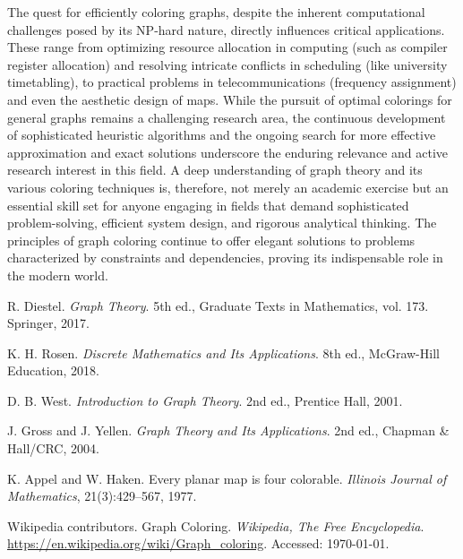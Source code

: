 \documentclass[11pt, a4paper]{article}
\begin{document}
The quest for efficiently coloring graphs, despite the inherent computational challenges posed by its NP-hard nature, directly influences critical applications. These range from optimizing resource allocation in computing (such as compiler register allocation) and resolving intricate conflicts in scheduling (like university timetabling), to practical problems in telecommunications (frequency assignment) and even the aesthetic design of maps. While the pursuit of optimal colorings for general graphs remains a challenging research area, the continuous development of sophisticated heuristic algorithms and the ongoing search for more effective approximation and exact solutions underscore the enduring relevance and active research interest in this field. A deep understanding of graph theory and its various coloring techniques is, therefore, not merely an academic exercise but an essential skill set for anyone engaging in fields that demand sophisticated problem-solving, efficient system design, and rigorous analytical thinking. The principles of graph coloring continue to offer elegant solutions to problems characterized by constraints and dependencies, proving its indispensable role in the modern world.

\newpage
\begin{thebibliography}{99} %
    R. Diestel. \textit{Graph Theory}. 5th ed., Graduate Texts in Mathematics, vol. 173. Springer, 2017.

    K. H. Rosen. \textit{Discrete Mathematics and Its Applications}. 8th ed., McGraw-Hill Education, 2018.

    D. B. West. \textit{Introduction to Graph Theory}. 2nd ed., Prentice Hall, 2001.

    J. Gross and J. Yellen. \textit{Graph Theory and Its Applications}. 2nd ed., Chapman & Hall/CRC, 2004.

    K. Appel and W. Haken. Every planar map is four colorable. \textit{Illinois Journal of Mathematics}, 21(3):429--567, 1977.

    Wikipedia contributors. Graph Coloring. \textit{Wikipedia, The Free Encyclopedia}. \url{https://en.wikipedia.org/wiki/Graph_coloring}. Accessed: \today.
\end{thebibliography}
\end{document}
